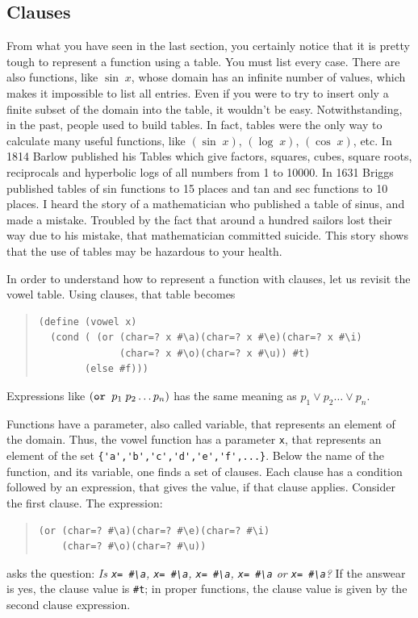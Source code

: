 \documentclass[a4paper,12pt]{book}
\begin{document}
\subsection{Clauses}
From what you have seen in the last section, you certainly notice that it is pretty tough to represent a
function using a table. You must list every case. There are also functions,
like $\sin\;x$, whose domain has an infinite number of values, which makes
it impossible to list all entries. 
Even if you were to try to insert only a finite
subset of the domain into the table, it wouldn't be easy. 
Notwithstanding, in the past,
people used to build tables. In fact, tables were the only way to calculate many
useful functions, like $(\sin\;x)$, 
$(\log\;x)$, $(\cos\;x)$, etc. In 1814 Barlow
published his Tables which give factors, squares, cubes, square roots, reciprocals
and hyperbolic logs of all numbers from 1 to 10000. In 1631 Briggs published
tables of sin functions to 15 places and tan and sec functions to 10 places.
I heard the story of a mathematician who published a table of sinus, and made
a mistake. Troubled by the fact that around a hundred sailors lost their way due to his
mistake, that mathematician committed suicide. This story shows that the use
of tables may be hazardous to your health.

In order to understand how to represent a function with clauses, let us revisit the vowel table.
 Using clauses, that table becomes
 \begin{quote}\small
\begin{verbatim}
(define (vowel x)
  (cond ( (or (char=? x #\a)(char=? x #\e)(char=? x #\i) 
              (char=? x #\o)(char=? x #\u)) #t)
        (else #f)))
\end{verbatim}
\end{quote}
Expressions like $(\verb|or | p_1\;p_2\ldots p_n)$ has the same 
meaning as $p_1 \vee p_2\ldots \vee p_n$.

Functions have a parameter, also called variable, that represents an element of the domain.
Thus, the vowel function has a parameter \verb|x|, that represents an element of the set
\verb|{'a','b','c','d','e','f',...}|.
Below the name of the function, and its variable, one finds a set of clauses.
Each clause has a condition followed by an expression, that gives the value,
 if that clause applies. Consider the first clause. The expression:
\begin{quote}
\begin{verbatim}
(or (char=? #\a)(char=? #\e)(char=? #\i)
    (char=? #\o)(char=? #\u))
\end{verbatim}
\end{quote}
asks the question: {\em Is \verb|x= #\a|,
 \verb|x= #\a|, \verb|x= #\a|, \verb|x= #\a| or
 \verb|x= #\a|?} If the answear is yes,
 the  clause  value is \verb|#t|; in proper functions,
the clause
 value is given by the second clause expression. 
\end{document}
